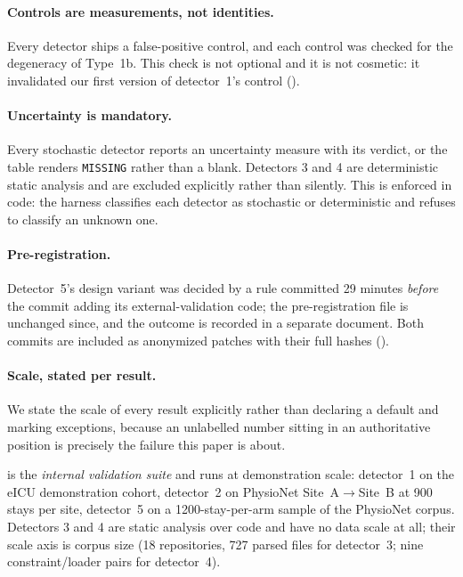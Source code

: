 \documentclass[pmlr,twocolumn,10pt]{jmlr}
\begin{document}
\paragraph{Controls are measurements, not identities.} Every detector ships a
false-positive control, and each control was checked for the degeneracy of
Type~1b. This check is not optional and it is not cosmetic: it invalidated our
first version of detector~1's control ().

\paragraph{Uncertainty is mandatory.} Every stochastic detector reports an
uncertainty measure with its verdict, or the table renders \texttt{MISSING}
rather than a blank. Detectors 3 and 4 are deterministic static analysis and are
excluded explicitly rather than silently. This is enforced in code: the harness
classifies each detector as stochastic or deterministic and refuses to classify
an unknown one.

\paragraph{Pre-registration.} Detector~5's design variant was decided by a rule
committed 29 minutes \emph{before} the commit adding its external-validation
code; the pre-registration file is unchanged since, and the outcome is recorded
in a separate document. Both commits are included as anonymized patches with
their full hashes ().

\paragraph{Scale, stated per result.} We state the scale of every result
explicitly rather than declaring a default and marking exceptions, because an
unlabelled number sitting in an authoritative position is precisely the failure
this paper is about.

 is the \emph{internal validation suite} and runs at
demonstration scale: detector~1 on the eICU demonstration cohort, detector~2 on
PhysioNet Site~A${\to}$Site~B at 900 stays per site, detector~5 on a
1200-stay-per-arm sample of the PhysioNet corpus. Detectors 3 and 4 are static
analysis over code and have no data scale at all; their scale axis is corpus
size (18 repositories, 727 parsed files for detector~3; nine constraint/loader
pairs for detector~4).
\end{document}
